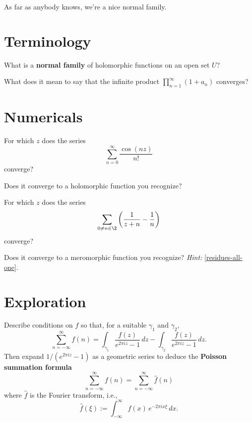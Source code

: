 \documentclass{homework}
\author{Jim Fowler}
\begin{document}
\maketitle

\begin{inspiration} %
  As far as anybody knows, we're a nice normal family.
\end{inspiration}

\section{Terminology}

\begin{problem}
  What is a \textbf{normal family} of holomorphic functions on an open set $U$?
\end{problem}

\begin{problem}\label{terminology-infinite-product}What does it mean to say that the infinite product
  \(
    \prod_{n=1}^\infty \left( 1 + a_n \right)
  \)
  converges?
\end{problem}

\section{Numericals}

\begin{problem}
  For which $z$ does the series
  \[
    \sum_{n=0}^\infty \frac{\cos \left( nz \right)}{n!}
  \]
  converge?

  Does it converge to a holomorphic function you recognize?
\end{problem}

\begin{problem}
  For which $z$ does the series
  \[
    \sum_{0 \neq n \in \Z} \left( \frac{1}{z+n} - \frac{1}{n} \right)
  \]
  converge?

  Does it converge to a meromorphic function you recognize?
  \textit{Hint:} \ref{residues-all-one}.
\end{problem}

\section{Exploration}

\begin{problem}\label{poisson-summation}Describe conditions on $f$ so
  that, for a suitable $\gamma_1$ and $\gamma_2$,
  \[
    \sum_{n=-\infty}^\infty f(n) = \int_{\gamma_1} \frac{f(z)}{e^{2\pi i z} - 1} \, dz - \int_{\gamma_2} \frac{f(z)}{e^{2\pi i z} - 1} \, dz.
  \]
  Then expand $1/(e^{2\pi i z} - 1)$ as a geometric series to deduce the \textbf{Poisson summation formula}
  \[
    \sum_{n=-\infty}^\infty f(n) = \sum_{n=-\infty}^\infty \hat{f}(n) 
  \]
  where $\hat{f}$ is the Fourier transform, i.e.,
  \[
    {\hat {f}}(\xi ) := \int _{-\infty }^{\infty} f(x) \, e^{-2\pi ix \xi} \,dx.
  \]
\end{problem}
\end{document}
